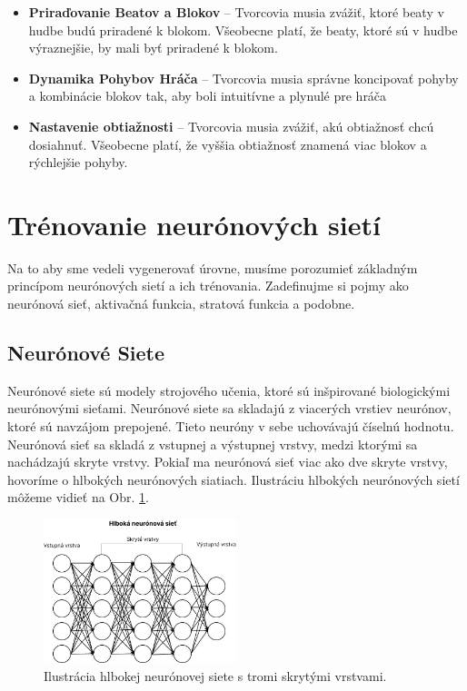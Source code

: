 \begin{itemize}
\item \textbf{Priraďovanie Beatov a Blokov} – Tvorcovia musia zvážiť, ktoré beaty v hudbe budú priradené k blokom. Všeobecne platí, že beaty, ktoré sú v hudbe výraznejšie, by mali byť priradené k blokom. 
\item \textbf{Dynamika Pohybov Hráča} – Tvorcovia musia správne koncipovať pohyby a kombinácie blokov tak, aby boli intuitívne a plynulé pre hráča
\item \textbf{Nastavenie obtiažnosti} – Tvorcovia musia zvážiť, akú obtiažnosť chcú dosiahnuť. Všeobecne platí, že vyššia obtiažnosť znamená viac blokov a rýchlejšie pohyby.
\end{itemize}

\section{Trénovanie neurónových sietí}\label{sec:trenovanie_nn}

Na to aby sme vedeli vygenerovať úrovne, musíme porozumieť základným princípom neurónových sietí a ich trénovania. Zadefinujme si pojmy ako neurónová sieť, aktivačná funkcia, stratová funkcia a podobne.

\subsection{Neurónové Siete} \label{sec:neuronove_siete}

Neurónové siete sú modely strojového učenia, ktoré sú inšpirované biologickými neurónovými sieťami. Neurónové siete sa skladajú z viacerých vrstiev neurónov, ktoré sú navzájom prepojené. Tieto neuróny v sebe uchovávajú číselnú hodnotu. Neurónová sieť sa skladá z vstupnej a výstupnej vrstvy, medzi ktorými sa nachádzajú skryte vrstvy. Pokiaľ ma neurónová sieť viac ako dve skryte vrstvy, hovoríme o hlbokých neurónových siatiach. Ilustráciu hlbokých neurónových sietí môžeme vidieť na Obr. \ref{fig:neuron}.

\begin{figure}[H]
\centerline{\includegraphics[width=0.5\textwidth]{images/hlboka neur siet.jpg}}
\caption{Ilustrácia hlbokej neurónovej siete s tromi skrytými vrstvami.}
\label{fig:neuron}
\end{figure}

